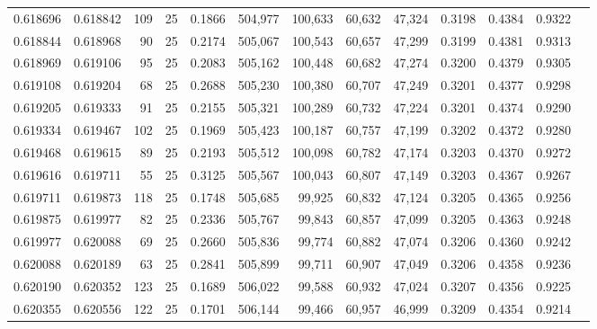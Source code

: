 \begin{tabular}{rrrrrrrrrrrrr}
0.618696 & 0.618842 &   109 &  25 &                                     0.1866 & 504,977 & 100,633 &  60,632 &  47,324 & 0.3198 & 0.4384 & 0.9322 \\
0.618844 & 0.618968 &    90 &  25 &                                     0.2174 & 505,067 & 100,543 &  60,657 &  47,299 & 0.3199 & 0.4381 & 0.9313 \\
0.618969 & 0.619106 &    95 &  25 &                                     0.2083 & 505,162 & 100,448 &  60,682 &  47,274 & 0.3200 & 0.4379 & 0.9305 \\
0.619108 & 0.619204 &    68 &  25 &                                     0.2688 & 505,230 & 100,380 &  60,707 &  47,249 & 0.3201 & 0.4377 & 0.9298 \\
0.619205 & 0.619333 &    91 &  25 &                                     0.2155 & 505,321 & 100,289 &  60,732 &  47,224 & 0.3201 & 0.4374 & 0.9290 \\
0.619334 & 0.619467 &   102 &  25 &                                     0.1969 & 505,423 & 100,187 &  60,757 &  47,199 & 0.3202 & 0.4372 & 0.9280 \\
0.619468 & 0.619615 &    89 &  25 &                                     0.2193 & 505,512 & 100,098 &  60,782 &  47,174 & 0.3203 & 0.4370 & 0.9272 \\
0.619616 & 0.619711 &    55 &  25 &                                     0.3125 & 505,567 & 100,043 &  60,807 &  47,149 & 0.3203 & 0.4367 & 0.9267 \\
0.619711 & 0.619873 &   118 &  25 &                                     0.1748 & 505,685 &  99,925 &  60,832 &  47,124 & 0.3205 & 0.4365 & 0.9256 \\
0.619875 & 0.619977 &    82 &  25 &                                     0.2336 & 505,767 &  99,843 &  60,857 &  47,099 & 0.3205 & 0.4363 & 0.9248 \\
0.619977 & 0.620088 &    69 &  25 &                                     0.2660 & 505,836 &  99,774 &  60,882 &  47,074 & 0.3206 & 0.4360 & 0.9242 \\
0.620088 & 0.620189 &    63 &  25 &                                     0.2841 & 505,899 &  99,711 &  60,907 &  47,049 & 0.3206 & 0.4358 & 0.9236 \\
0.620190 & 0.620352 &   123 &  25 &                                     0.1689 & 506,022 &  99,588 &  60,932 &  47,024 & 0.3207 & 0.4356 & 0.9225 \\
0.620355 & 0.620556 &   122 &  25 &                                     0.1701 & 506,144 &  99,466 &  60,957 &  46,999 & 0.3209 & 0.4354 & 0.9214 \\

\end{tabular}
